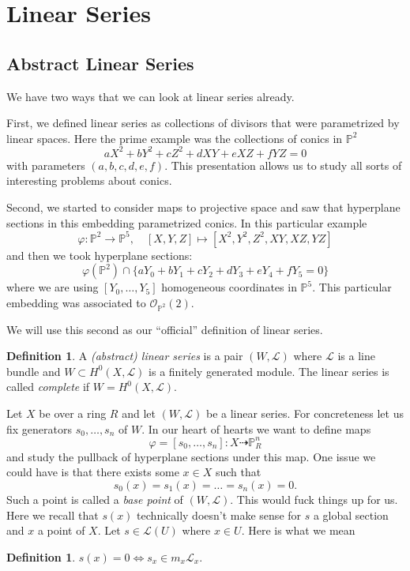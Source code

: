 \documentclass[12pt]{article}
\numberwithin{equation}{section}
\theoremstyle{definition}
\newtheorem{definition}[theorem]{Definition}
\theoremstyle{remark}
\newcommand{\Ocal}{\mathcal{O}}
\newcommand{\PP}{\mathbb{P}}
\newcommand{\Lcal}{\mathcal{L}}
\begin{document}
\section{Linear Series}

\subsection{Abstract Linear Series}
We have two ways that we can look at linear series already. 

First, we defined linear series as collections of divisors that were parametrized by linear spaces. 
Here the prime example was the collections of conics in $\PP^2$ 
 $$ aX^2 + bY^2+cZ^2+dXY+eXZ+fYZ=0$$
with parameters $(a,b,c,d,e,f)$.
This presentation allows us to study all sorts of interesting problems about conics. 

Second, we started to consider maps to projective space and saw that hyperplane sections in this embedding parametrized conics. 
In this particular example 
$$\varphi:\PP^2\to \PP^5, \quad [X,Y,Z] \mapsto [X^2,Y^2,Z^2,XY,XZ,YZ] $$
and then we took hyperplane sections: 
 $$ \varphi(\PP^2) \cap \lbrace a Y_0 + b Y_1 + c Y_2 + d Y_3 + e Y_4 +f Y_5= 0 \rbrace$$
where we are using $[Y_0,\ldots,Y_5]$ homogeneous coordinates in $\PP^5$. 
This particular embedding was associated to $\Ocal_{\PP^2}(2)$.

We will use this second as our ``official'' definition of linear series.
\begin{definition}
	A \emph{(abstract) linear series} is a pair $(W,\Lcal)$ where $\Lcal$ is a line bundle and $W \subset H^0(X,\Lcal)$ is a finitely generated module. 
	The linear series is called \emph{complete} if $W = H^0(X,\Lcal)$.
\end{definition}
Let $X$ be over a ring $R$ and let $(W,\Lcal)$ be a linear series. 
For concreteness let us fix generators $s_0,\ldots,s_n$ of $W$. 
In our heart of hearts we want to define maps 
\begin{equation}\label{eqn:rational-map}
 \varphi = [s_0,\ldots,s_n]: X \dashrightarrow \PP^n_R
\end{equation}
and study the pullback of hyperplane sections under this map. 
One issue we could have is that there exists some $x\in X$ such that 
$$s_0(x)=s_1(x)=\ldots=s_n(x)=0.$$
Such a point is called a \emph{base point} of $(W,\Lcal)$. 
This would fuck things up for us.
Here we recall that $s(x)$ technically doesn't make sense for $s$ a global section and $x$ a point of $X$. 
Let $s \in \Lcal(U)$ where $x\in U$. 
Here is what we mean
\begin{definition}
	$s(x)=0 \iff s_x \in m_x \Lcal_x.$
\end{definition}
\end{document}
